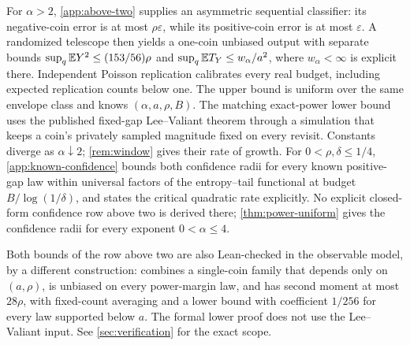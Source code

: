 For $\alpha>2$, \cref{app:above-two} supplies an asymmetric sequential
classifier: its negative-coin error is at most $\rho\varepsilon$, while
its positive-coin error is at most $\varepsilon$. A randomized telescope
then yields a one-coin unbiased output with separate bounds
$\sup_q\mathbb E Y^2\le(153/56)\rho$ and $\sup_q\mathbb E T_Y\le w_\alpha/a^2$,
where $w_\alpha<\infty$ is explicit there. Independent Poisson replication
calibrates every real budget, including expected replication counts
below one. The upper bound is uniform over the same envelope class and
knows $(\alpha,a,\rho,B)$.
The matching exact-power lower bound uses the published fixed-gap
Lee--Valiant theorem through a simulation that keeps a coin's privately
sampled magnitude fixed on every revisit. Constants diverge as
$\alpha\downarrow2$; \cref{rem:window} gives their rate of growth. For $0<\rho,\delta\le1/4$, \cref{app:known-confidence}
bounds both confidence radii for every known positive-gap law within
universal factors of the entropy--tail functional at budget
$B/\log(1/\delta)$, and states the critical quadratic rate explicitly. No
explicit closed-form confidence row above two is derived there;
\cref{thm:power-uniform} gives the confidence radii for every exponent
$0<\alpha\le4$.

Both bounds of the row above two are also Lean-checked in the observable
model, by a different construction:
 combines a single-coin family that
depends only on $(a,\rho)$, is unbiased on every power-margin law, and
has second moment at most $28\rho$, with fixed-count averaging and a
lower bound with coefficient $1/256$ for every law supported below $a$.
The formal lower proof does not use the Lee--Valiant input. See
\cref{sec:verification} for the exact scope.

